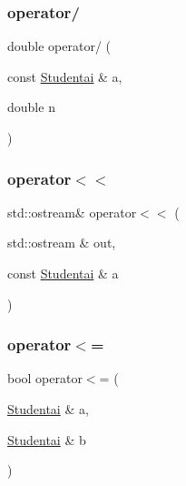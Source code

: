\mbox{\label{class_studentai_aa6578f090b8fb8fa338d6d1481b787bf}} 
\subsubsection{\texorpdfstring{operator/}{operator/}}
{\footnotesize\ttfamily double operator/ (\begin{DoxyParamCaption}\item[{const \mbox{\hyperlink{class_studentai}{Studentai}} \&}]{a,  }\item[{double}]{n }\end{DoxyParamCaption})\hspace{0.3cm}{\ttfamily [friend]}}

\mbox{\label{class_studentai_a7fa0ac541336749ef2d674fd1996e8d5}} 
\subsubsection{\texorpdfstring{operator$<$$<$}{operator<<}}
{\footnotesize\ttfamily std\+::ostream\& operator$<$$<$ (\begin{DoxyParamCaption}\item[{std\+::ostream \&}]{out,  }\item[{const \mbox{\hyperlink{class_studentai}{Studentai}} \&}]{a }\end{DoxyParamCaption})\hspace{0.3cm}{\ttfamily [friend]}}

\mbox{\label{class_studentai_a899347d8f518e1b28175dda7b5674cf2}} 
\subsubsection{\texorpdfstring{operator$<$=}{operator<=}}
{\footnotesize\ttfamily bool operator$<$= (\begin{DoxyParamCaption}\item[{\mbox{\hyperlink{class_studentai}{Studentai}} \&}]{a,  }\item[{\mbox{\hyperlink{class_studentai}{Studentai}} \&}]{b }\end{DoxyParamCaption})\hspace{0.3cm}{\ttfamily [friend]}}

